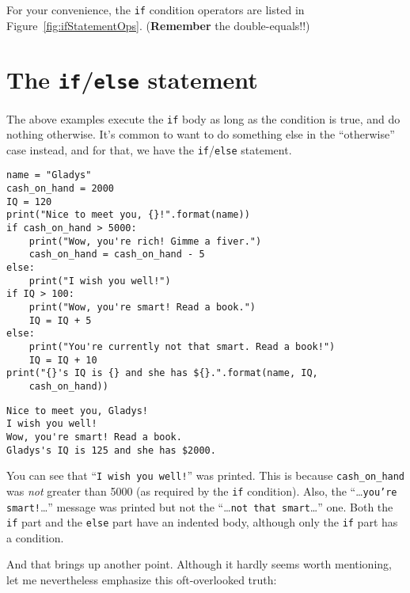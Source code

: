 
For your convenience, the \texttt{if} condition operators are listed in
Figure~\ref{fig:ifStatementOps}. (\textbf{Remember} the double-equals!!)


\section{The \texttt{if}/\texttt{else} statement}


The above examples execute the \texttt{if} body as long as the condition is
true, and do nothing otherwise. It's common to want to do something else in the
``otherwise'' case instead, and for that, we have the \texttt{if}/\texttt{else}
statement.

\begin{Verbatim}[fontsize=\footnotesize,samepage=true,frame=single,framesep=3mm]
name = "Gladys"
cash_on_hand = 2000
IQ = 120
print("Nice to meet you, {}!".format(name))
if cash_on_hand > 5000:
    print("Wow, you're rich! Gimme a fiver.")
    cash_on_hand = cash_on_hand - 5
else:
    print("I wish you well!")
if IQ > 100:
    print("Wow, you're smart! Read a book.")
    IQ = IQ + 5
else:
    print("You're currently not that smart. Read a book!")
    IQ = IQ + 10
print("{}'s IQ is {} and she has ${}.".format(name, IQ,
    cash_on_hand))
\end{Verbatim}
\vspace{-.2in}

\begin{Verbatim}[fontsize=\small,samepage=true,frame=leftline,framesep=5mm,framerule=1mm]
Nice to meet you, Gladys!
I wish you well!
Wow, you're smart! Read a book.
Gladys's IQ is 125 and she has $2000.
\end{Verbatim}

You can see that ``\texttt{I wish you well!}'' was printed. This is because
\texttt{cash\_on\_hand} was \textit{not} greater than 5000 (as required by the
\texttt{if} condition). Also, the ``\dots\texttt{you're smart!}\dots''
message was printed but not the ``\dots\texttt{not that smart}\dots'' one.
Both the \texttt{if} part and the \texttt{else} part have an indented body,
although only the \texttt{if} part has a condition.

And that brings up another point. Although it hardly seems worth mentioning,
let me nevertheless emphasize this oft-overlooked truth:

